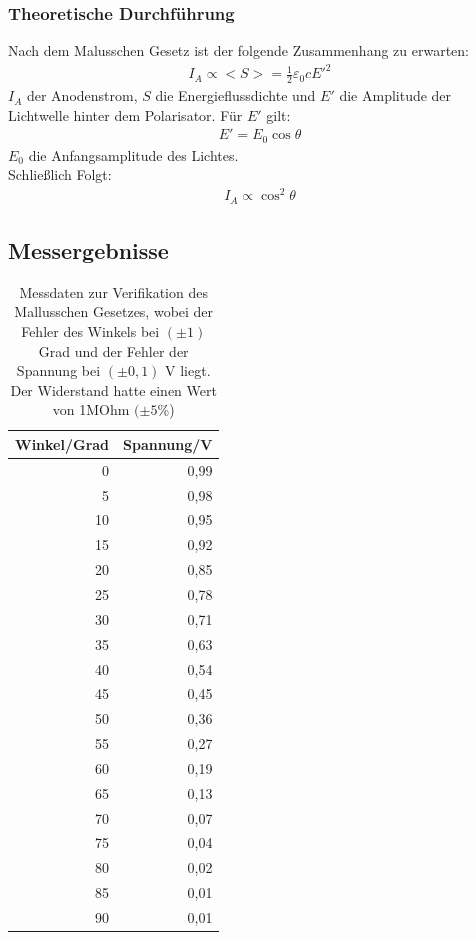 \documentclass[12pt]{scrartcl}
\begin{document}
\subsubsection{Theoretische Durchführung}
Nach dem Malusschen Gesetz ist der folgende Zusammenhang zu erwarten:
\begin{align}
I_A \propto <S> = \frac{1}{2} \varepsilon_0 c E'^2
\end{align}
$I_A$ der Anodenstrom, $S$ die Energieflussdichte und $E'$ die Amplitude der Lichtwelle hinter dem Polarisator.
Für $E'$ gilt:
\begin{align}
E' = E_0 \cos{\theta}
\end{align}
$E_0$ die Anfangsamplitude des Lichtes.\\
Schließlich Folgt:
\begin{align}
I_A \propto \cos^2{\theta}
\end{align}
\subsection{Messergebnisse}
\begin{table}[H]
\caption{Messdaten zur Verifikation des Mallusschen Gesetzes, wobei der Fehler des Winkels bei $(\pm 1)$ Grad  und der Fehler der Spannung bei $(\pm 0,1)$ V liegt. Der Widerstand hatte einen Wert von 1MOhm $(\pm 5$\%)}
\begin{center}
\begin{tabular}{|r|r|}
\hline
\multicolumn{1}{|l|}{Winkel/Grad} & \multicolumn{1}{l|}{Spannung/V} \\ \hline
0 & 0,99 \\ \hline
5 & 0,98 \\ \hline
10 & 0,95 \\ \hline
15 & 0,92 \\ \hline
20 & 0,85 \\ \hline
25 & 0,78 \\ \hline
30 & 0,71 \\ \hline
35 & 0,63 \\ \hline
40 & 0,54 \\ \hline
45 & 0,45 \\ \hline
50 & 0,36 \\ \hline
55 & 0,27 \\ \hline
60 & 0,19 \\ \hline
65 & 0,13 \\ \hline
70 & 0,07 \\ \hline
75 & 0,04 \\ \hline
80 & 0,02 \\ \hline
85 & 0,01 \\ \hline
90 & 0,01 \\ \hline
\end{tabular}
\end{center}
\label{tab:a_1}
\end{table}
\end{document}
